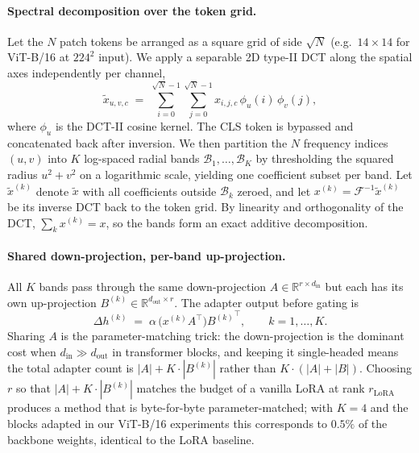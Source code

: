 \documentclass{article}
\begin{document}
\paragraph{Spectral decomposition over the token grid.} Let the $N$ patch tokens be arranged as a square grid of side $\sqrt{N}$ (e.g.\ $14 \times 14$ for ViT-B/16 at $224^2$ input). We apply a separable 2D type-II DCT along the spatial axes independently per channel,
\begin{equation}
\tilde{x}_{u,v,c} \;=\; \sum_{i=0}^{\sqrt{N}-1} \sum_{j=0}^{\sqrt{N}-1} x_{i,j,c} \, \phi_u(i)\, \phi_v(j),
\end{equation}
where $\phi_u$ is the DCT-II cosine kernel. The CLS token is bypassed and concatenated back after inversion. We then partition the $N$ frequency indices $(u,v)$ into $K$ log-spaced radial bands $\mathcal{B}_1, \ldots, \mathcal{B}_K$ by thresholding the squared radius $u^2 + v^2$ on a logarithmic scale, yielding one coefficient subset per band. Let $\tilde{x}^{(k)}$ denote $\tilde{x}$ with all coefficients outside $\mathcal{B}_k$ zeroed, and let $x^{(k)} = \mathcal{F}^{-1}\tilde{x}^{(k)}$ be its inverse DCT back to the token grid. By linearity and orthogonality of the DCT, $\sum_k x^{(k)} = x$, so the bands form an exact additive decomposition.

\paragraph{Shared down-projection, per-band up-projection.} All $K$ bands pass through the same down-projection $A \in \mathbb{R}^{r \times d_{\text{in}}}$ but each has its own up-projection $B^{(k)} \in \mathbb{R}^{d_{\text{out}} \times r}$. The adapter output before gating is
\begin{equation}
\Delta h^{(k)} \;=\; \alpha \, \bigl(x^{(k)} A^{\top}\bigr) {B^{(k)}}^{\top}, \qquad k = 1, \ldots, K.
\end{equation}
Sharing $A$ is the parameter-matching trick: the down-projection is the dominant cost when $d_{\text{in}} \gg d_{\text{out}}$ in transformer blocks, and keeping it single-headed means the total adapter count is $|A| + K \cdot |B^{(k)}|$ rather than $K \cdot (|A| + |B|)$. Choosing $r$ so that $|A| + K \cdot |B^{(k)}|$ matches the budget of a vanilla LoRA at rank $r_{\text{LoRA}}$ produces a method that is byte-for-byte parameter-matched; with $K=4$ and the blocks adapted in our ViT-B/16 experiments this corresponds to $0.5\%$ of the backbone weights, identical to the LoRA baseline.
\end{document}
